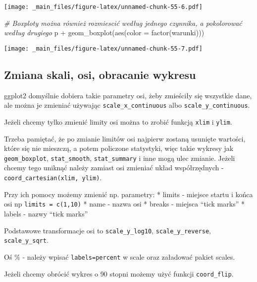 \documentclass[
]{book}
\newenvironment{Shaded}{\begin{snugshade}}{\end{snugshade}}
\newcommand{\AttributeTok}[1]{\textcolor[rgb]{0.77,0.63,0.00}{#1}}
\newcommand{\CommentTok}[1]{\textcolor[rgb]{0.56,0.35,0.01}{\textit{#1}}}
\newcommand{\FunctionTok}[1]{\textcolor[rgb]{0.00,0.00,0.00}{#1}}
\newcommand{\NormalTok}[1]{#1}
\newcommand{\SpecialCharTok}[1]{\textcolor[rgb]{0.00,0.00,0.00}{#1}}
\begin{document}
\texttt{[image: \_main\_files/figure-latex/unnamed-chunk-55-6.pdf]}

\begin{Shaded}
\begin{Highlighting}[]
\CommentTok{\# Boxploty można również rozmiescić według jednego czynnika, a pokolorować według drugiego}
\NormalTok{p }\SpecialCharTok{+} \FunctionTok{geom\_boxplot}\NormalTok{(}\FunctionTok{aes}\NormalTok{(}\AttributeTok{color =} \FunctionTok{factor}\NormalTok{(warunki)))}
\end{Highlighting}
\end{Shaded}

\texttt{[image: \_main\_files/figure-latex/unnamed-chunk-55-7.pdf]}

\hypertarget{zmiana-skali-osi-obracanie-wykresu}{%
\subsection{Zmiana skali, osi, obracanie wykresu}\label{zmiana-skali-osi-obracanie-wykresu}}

ggplot2 domyślnie dobiera takie parametry osi, żeby zmieściły się wszystkie dane, ale można je zmieniać używając \texttt{scale\_x\_continuous} albo \texttt{scale\_y\_continuous}.

Jeżeli chcemy tylko zmienić limity osi można to zrobić funkcją \texttt{xlim} i \texttt{ylim}.

Trzeba pamiętać, że po zmianie limitów osi najpierw zostaną usunięte wartości, które się nie mieszczą, a potem policzone statystyki, więc takie wykresy jak \texttt{geom\_boxplot}, \texttt{stat\_smooth}, \texttt{stat\_summary} i inne mogą ulec zmianie. Jeżeli chcemy tego uniknąć należy zamiast osi zmieniać układ współrzędnych - \texttt{coord\_cartesian(xlim,\ ylim)}.

Przy ich pomocy możemy zmienić np. parametry:
* limits - miejsce startu i końca osi np \texttt{limits\ =\ c(1,10)}
* name - nazwa osi
* breaks - miejsca ``tick marks''
* labels - nazwy ``tick marks''

Podstawowe transformacje osi to \texttt{scale\_y\_log10}, \texttt{scale\_y\_reverse}, \texttt{scale\_y\_sqrt}.

Oś \% - należy wpisać \texttt{labels=percent} w scale oraz załadować pakiet scales.

Jeżeli chcemy obrócić wykres o 90 stopni możemy użyć funkcji \texttt{coord\_flip}.
\end{document}
